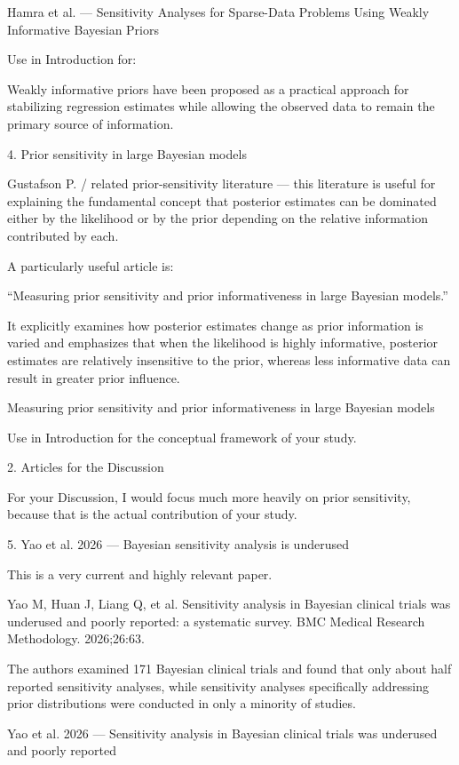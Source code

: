 Hamra et al. — Sensitivity Analyses for Sparse-Data Problems Using Weakly Informative Bayesian Priors

Use in Introduction for:

Weakly informative priors have been proposed as a practical approach for stabilizing regression estimates while allowing the observed data to remain the primary source of information.

4. Prior sensitivity in large Bayesian models

Gustafson P. / related prior-sensitivity literature — this literature is useful for explaining the fundamental concept that posterior estimates can be dominated either by the likelihood or by the prior depending on the relative information contributed by each.

A particularly useful article is:

“Measuring prior sensitivity and prior informativeness in large Bayesian models.”

It explicitly examines how posterior estimates change as prior information is varied and emphasizes that when the likelihood is highly informative, posterior estimates are relatively insensitive to the prior, whereas less informative data can result in greater prior influence.

Measuring prior sensitivity and prior informativeness in large Bayesian models

Use in Introduction for the conceptual framework of your study.

2. Articles for the Discussion

For your Discussion, I would focus much more heavily on prior sensitivity, because that is the actual contribution of your study.

5. Yao et al. 2026 — Bayesian sensitivity analysis is underused

This is a very current and highly relevant paper.

Yao M, Huan J, Liang Q, et al. Sensitivity analysis in Bayesian clinical trials was underused and poorly reported: a systematic survey. BMC Medical Research Methodology. 2026;26:63.

The authors examined 171 Bayesian clinical trials and found that only about half reported sensitivity analyses, while sensitivity analyses specifically addressing prior distributions were conducted in only a minority of studies.

Yao et al. 2026 — Sensitivity analysis in Bayesian clinical trials was underused and poorly reported

